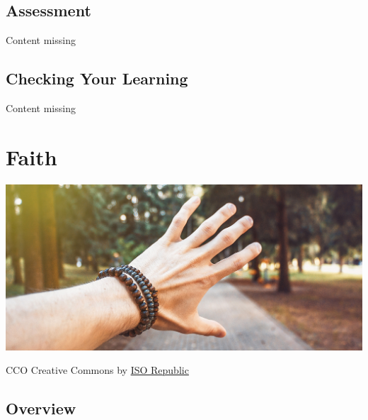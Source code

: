 \documentclass[
]{book}
\begin{document}
\hypertarget{assessment-1}{%
\section*{Assessment}\label{assessment-1}}

{Content missing}

\hypertarget{checking-your-learning-1}{%
\section*{Checking Your Learning}\label{checking-your-learning-1}}

{Content missing}

\hypertarget{faith}{%
\chapter{Faith}\label{faith}}

\includegraphics{assets/u3/Unit3Overview.jpg}

CCO Creative Commons by \href{https://isorepublic.com/photo/hand-reach/}{ISO Republic}

\hypertarget{overview-2}{%
\section{Overview}\label{overview-2}}
\end{document}
